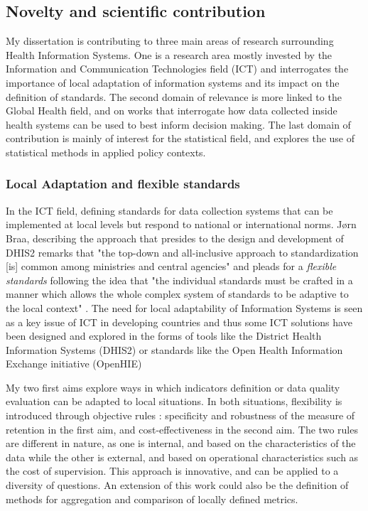 \subsection{Novelty and scientific contribution}

My dissertation is contributing to three main areas of research surrounding Health Information Systems. One is a research area mostly invested by the Information and Communication Technologies field (ICT) and interrogates the importance of local adaptation of information systems and its impact on the definition of standards. The second domain of relevance is more linked to the Global Health field, and on works that interrogate how data collected inside health systems can be used to best inform decision making. The last domain of contribution is mainly of interest for the statistical field, and explores the use of statistical methods in applied policy contexts.

\subsubsection{Local Adaptation and flexible standards}

In the ICT field, defining standards for data collection systems that can be implemented at local levels but respond to national or international norms. Jørn Braa, describing the approach that presides to the design and development of DHIS2 remarks that "the top-down and all-inclusive approach to standardization [is] common among ministries and central agencies" and pleads for a \textit{flexible standards} following the idea that "the individual standards must be crafted in a manner which allows the whole complex system of standards to be adaptive to the local context" \cite{braa_developing_2007}. The need for local adaptability of Information Systems is seen as a key issue of ICT in developing countries \cite{macfarlane_harmonizing_2005,walsham_research_2006,walsham_foreword:_2007,jacucci_standardization_2006} and thus some ICT solutions have been designed and explored in the forms of tools like the District Health Information Systems (DHIS2) or standards like the Open Health Information Exchange initiative (OpenHIE)

My two first aims explore ways in which indicators definition or data quality evaluation can be adapted to local situations. In both situations, flexibility is introduced through objective rules : specificity and robustness of the measure of retention in the first aim, and cost-effectiveness in the second aim. The two rules are different in nature, as one is internal, and based on the characteristics of the data while the other is external, and based on operational characteristics such as the cost of supervision. This approach is innovative, and can be applied to a diversity of questions. An extension of this work could also be the definition of methods for aggregation and comparison of locally defined metrics.

